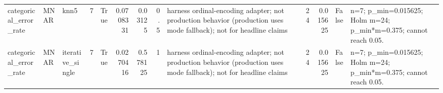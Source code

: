 \begin{table}[ht]
\begin{tabular}{lllrlrrrlrrll}
 categorical\_error\_rate & MNAR        & knn5             &            7 & True                &       0.0708331  & 0.03125     & 0.5       & harness ordinal-encoding adapter; not production behavior (production uses mode fallback); not for headline claims &                             24 &                        0.015625    & False                       & n=7; p\_min=0.015625; Holm m=24; p\_min*m=0.375; cannot reach 0.05.  \\
 categorical\_error\_rate & MNAR        & iterative\_single &            7 & True                &       0.0270416  & 0.578125    & 1         & harness ordinal-encoding adapter; not production behavior (production uses mode fallback); not for headline claims &                             24 &                        0.015625    & False                       & n=7; p\_min=0.015625; Holm m=24; p\_min*m=0.375; cannot reach 0.05.  \\
\hline
\end{tabular}
\end{table}
